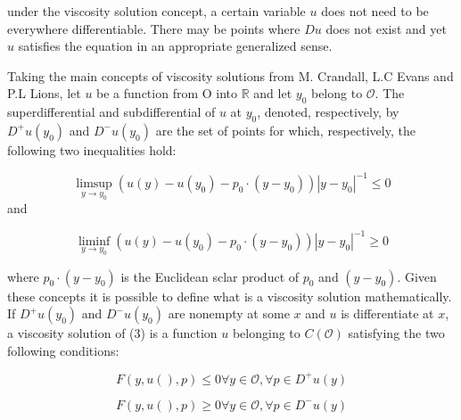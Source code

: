 under the viscosity solution concept, a certain variable $u$ does not need to be everywhere differentiable. There may be points where $Du$ does not exist and yet $u$ satisfies the equation in an appropriate generalized sense.

Taking the main concepts of viscosity solutions from M. Crandall, L.C Evans and P.L Lions, let $u$ be a function from O into $\mathbb{R}$  and let $y_0$ belong to $\mathcal{O}$.  The superdifferential and subdifferential of $u$ at $y_0$, denoted, respectively, by $D^{+} u(y_0)$ and $D^{-} u(y_0)$ are the set of points for which, respectively, the following two inequalities hold:

\begin{equation}
	\limsup_{y \to y_0} (u(y)-u(y_0)-p_0 \cdot (y-y_0)) |y-y_0|^{-1} \leq 0
\end{equation}
and

\begin{equation}
	\liminf_{y \to y_0} (u(y)-u(y_0)-p_0 \cdot (y-y_0)) |y-y_0|^{-1} \geq 0
\end{equation}

where $p_0 \cdot (y-y_0)$ is the Euclidean sclar product of $p_0$ and $(y-y_0)$. 
Given these concepts it is possible to define what is a viscosity solution mathematically. 
If $D^+u(y_0)$ and $D^-u(y_0)$ are nonempty at some $x$ and $u$ is differentiate at $x$, a viscosity solution of (3) is a function $u$ belonging to $C(\mathcal{O})$ satisfying the two following conditions:

\begin{equation}
	F(y,u(),p)\leq 0 \forall y \in \mathcal{O}, \forall p \in D^+ u(y)
\end{equation}

\begin{equation}
	F(y,u(),p)\geq 0 \forall y \in \mathcal{O}, \forall p \in D^- u(y)
\end{equation}



